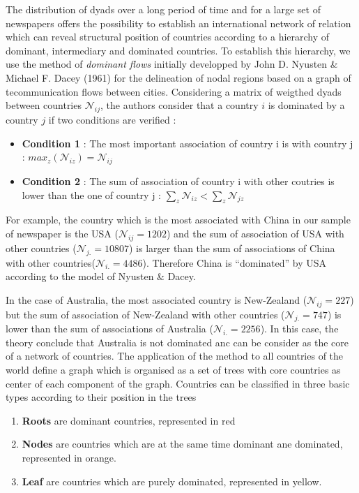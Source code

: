 \documentclass[
]{article}
\providecommand{\tightlist}{%
  \setlength{\itemsep}{0pt}\setlength{\parskip}{0pt}}
\begin{document}
The distribution of dyads over a long period of time and for a large set
of newspapers offers the possibility to establish an international
network of relation which can reveal structural position of countries
according to a hierarchy of dominant, intermediary and dominated
countries. To establish this hierarchy, we use the method of
\emph{dominant flows} initially developped by John D. Nyusten \& Michael
F. Dacey (1961) for the delineation of nodal regions based on a graph of
tecommunication flows between cities. Considering a matrix of weigthed
dyads between countries \(\mathcal{N}_{ij}\), the authors consider that
a country \(i\) is dominated by a country \(j\) if two conditions are
verified :

\begin{itemize}
\item
  \textbf{Condition 1} : The most important association of country i is
  with country j : \(max_{z}(\mathcal{N}_{iz}) = \mathcal{N}_{ij}\)
\item
  \textbf{Condition 2} : The sum of association of country i with other
  coutries is lower than the one of country j :
  \(\sum_{z} \mathcal{N}_{iz} < \sum_{z} \mathcal{N}_{jz}\)
\end{itemize}

For example, the country which is the most associated with China in our
sample of newspaper is the USA (\(\mathcal{N}_{ij} = 1202\)) and the sum
of association of USA with other countries
(\(\mathcal{N}_{j.} = 10807\)) is larger than the sum of associations of
China with other countries(\(\mathcal{N}_{i.} = 4486\)). Therefore China
is ``dominated'' by USA according to the model of Nyusten \& Dacey.

In the case of Australia, the most associated country is New-Zealand
(\(\mathcal{N}_{ij} = 227\)) but the sum of association of New-Zealand
with other countries (\(\mathcal{N}_{j.} = 747\)) is lower than the sum
of associations of Australia (\(\mathcal{N}_{i.} = 2256\)). In this
case, the theory conclude that Australia is not dominated anc can be
consider as the core of a network of countries. The application of the
method to all countries of the world define a graph which is organised
as a set of trees with core countries as center of each component of the
graph. Countries can be classified in three basic types according to
their position in the trees

\begin{enumerate}
\def\labelenumi{\arabic{enumi}.}
\tightlist
\item
  \textbf{Roots} are dominant countries, represented in red
\item
  \textbf{Nodes} are countries which are at the same time dominant ane
  dominated, represented in orange.
\item
  \textbf{Leaf} are countries which are purely dominated, represented in
  yellow.
\end{enumerate}
\end{document}
